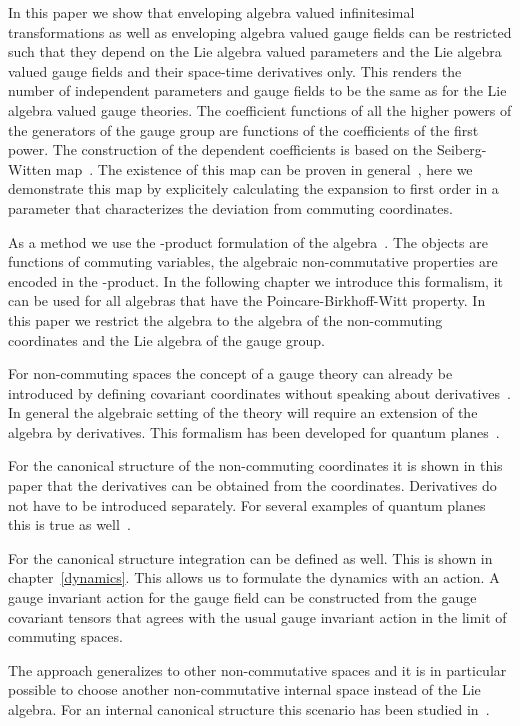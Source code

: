 \documentclass[a4paper,11pt]{article}
\begin{document}
In this paper we show that enveloping algebra valued 
infinitesimal transformations as well as  enveloping
algebra valued gauge fields can be restricted such that they
depend on the Lie algebra valued parameters and the Lie 
algebra valued gauge fields and their space-time derivatives only.
This renders the number of independent parameters and
gauge fields to be the same as for the Lie algebra valued
gauge theories. The coefficient functions of all the higher powers
of the generators of the gauge group are functions of the
coefficients of the first power. The construction of the 
dependent coefficients is based on the Seiberg-Witten map~\cite{SW}.
The existence of this map can be proven in general~\cite{JS,JSW,JSW2}, here we
demonstrate this map by explicitely calculating the expansion to first order
in a parameter that characterizes the deviation from commuting coordinates.

As a method we use the \myHighlight{$*$}\coordHE{}-product formulation of the
algebra~\cite{Weyl,Wigner,Moyal,BFFLS,Kontsevich,Sternheimer}. The objects are
functions of commuting variables, the algebraic  non-commutative properties
are encoded in the \myHighlight{$*$}\coordHE{}-product. In the following chapter we introduce this
formalism, it can be used for all algebras that have the
Poincare-Birkhoff-Witt property. In this paper we restrict the algebra to the
algebra of the non-commuting  coordinates and the Lie algebra of the gauge
group. 

For non-commuting spaces the concept of a gauge theory
can already be introduced by defining covariant coordinates
without speaking about derivatives~\cite{MSSW}. 
In general the algebraic setting of the theory will require
an extension of the algebra by derivatives. This formalism has
been developed for quantum planes~\cite{WZ}. 

For the canonical structure
of the non-commuting coordinates it is shown in this paper that
the derivatives can be obtained from the coordinates. Derivatives
do not have to be introduced separately. For several examples of
quantum planes this is true as well~\cite{W}.

For the canonical structure integration can be defined as well. This
is shown in chapter~\ref{dynamics}. This allows us to formulate the dynamics with 
an action. A gauge invariant action for the gauge field can be constructed
from the gauge covariant tensors that agrees with the usual 
gauge invariant action in the limit of commuting spaces.

The approach generalizes to other non-commutative spaces and it is in particular
possible to choose another non-commutative internal space instead of the
Lie algebra. For an internal canonical structure this scenario has been studied
in~\cite{Wise}.
\end{document}
